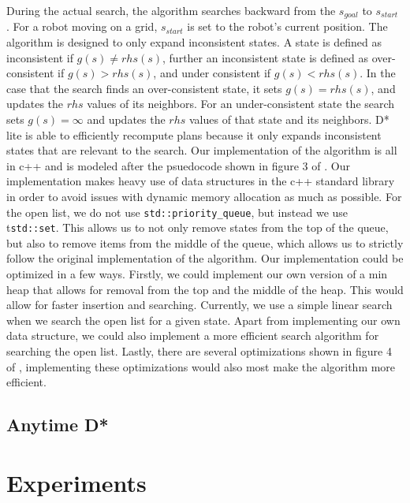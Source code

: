 \documentclass{article}
\begin{document}
During the actual search, the algorithm searches backward from the $s_{goal}$ to $s_{start}$ . For a robot moving on a grid, $s_{start}$ is set to the robot's current position. The algorithm is designed to only expand inconsistent states. A state is defined as inconsistent if $g(s) \neq rhs(s)$, further an inconsistent state is defined as over-consistent if $g(s) > rhs(s)$, and under consistent if $g(s) < rhs(s)$. In the case that the search finds an over-consistent state, it sets $g(s)=rhs(s)$, and updates the $rhs$ values of its neighbors. For an under-consistent state the search sets $g(s)=\infty$ and updates the $rhs$ values of that state and its neighbors. D* lite is able to efficiently recompute plans because it only expands inconsistent states that are relevant to the search. Our implementation of the algorithm is all in c++ and is modeled after the psuedocode shown in figure 3 of \cite{D_star_lite}. Our implementation makes heavy use of data structures in the c++ standard library in order to avoid issues with dynamic memory allocation as much as possible. For the open list, we do not use \texttt{std::priority\_queue}, but instead we use t\texttt{std::set}. This allows us to not only remove states from the top of the queue, but also to remove items from the middle of the queue, which allows us to strictly follow the original implementation of the algorithm. Our implementation could be optimized in a few ways. Firstly, we could implement our own version of a min heap that allows for removal from the top and the middle of the heap. This would allow for faster insertion and searching. Currently, we use a simple linear search when we search the open list for a given state. Apart from implementing our own data structure, we could also implement a more efficient search algorithm for searching the open list. Lastly, there are several optimizations shown in figure 4 of \cite{D_star_lite}, implementing these optimizations would also most make the algorithm more efficient.

\subsection{Anytime D*}

\section{Experiments}
\end{document}
